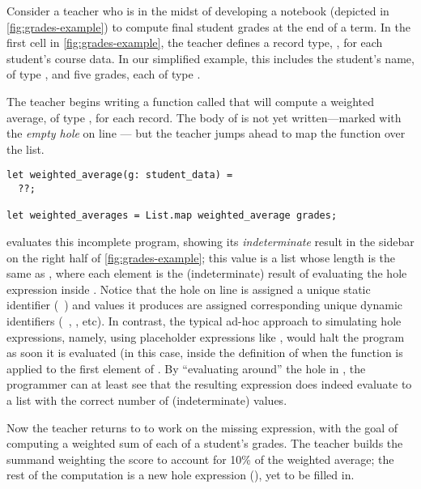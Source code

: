 

Consider a teacher who is in the midst of developing a \HazelnutLive{} notebook
(depicted in \autoref{fig:grades-example}) to compute final student grades at
the end of a term.
%
In the first cell in \autoref{fig:grades-example}, the teacher defines a record
type, , for each student's course data.
%
In our simplified example, this includes the student's name, of type
, and five grades, each of type .

%
The teacher begins writing a function called  that will
compute a weighted average, of type , for each 
record.
%
The body of  is not yet written---marked with the
\emph{empty hole} on line --- but the teacher jumps ahead to map the
function over the  list.

\begin{lstlisting}
let weighted_average(g: student_data) =
  ??;

let weighted_averages = List.map weighted_average grades;
\end{lstlisting}

\noindent
%
\HazelnutLive{} evaluates this incomplete program, showing its
\emph{indeterminate} result in the sidebar on the right half of
\autoref{fig:grades-example}; this value is a list whose length is the same as
, where each element is the (indeterminate) result of evaluating the
hole expression inside .
%
Notice that the hole on line  is assigned a unique static identifier
(\ie{}~) and values it produces are assigned corresponding unique dynamic
identifiers (\ie{}~, , etc{}).
%
In contrast, the typical ad-hoc approach to simulating hole expressions, namely,
using placeholder expressions like , would halt
the program as soon it is evaluated (in this case, inside the definition of
 when the function is applied to the first element of .
%
By ``evaluating around'' the hole in \HazelnutLive{}, the programmer can at
least see that the resulting expression does indeed evaluate to a list with the
correct number of (indeterminate) values.

Now the teacher returns to  to work on the missing
expression, with the goal of computing a weighted sum of each of a student's
grades.
%
The teacher builds the summand weighting the  score to account for 10\%
of the weighted average; the rest of the computation is a new hole expression
(), yet to be filled in.

